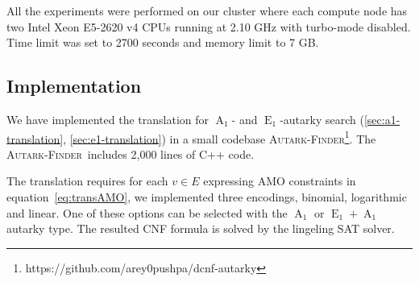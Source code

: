 \documentclass[runningheads]{llncs}
\DeclareMathOperator{\Aaut}{A}
\DeclareMathOperator{\Eaut}{E}
\newcommand{\autfinder}{\textsc{Autark-Finder}}
\begin{document}
All the experiments were performed on our cluster where each compute node has
two Intel Xeon E5-2620 v4 CPUs running at 2.10 GHz with turbo-mode disabled.
Time limit was set to 2700 seconds and memory limit to 7 GB.

\subsection{Implementation}
We have implemented the translation for $\Aaut_1$- and $\Eaut_1$-autarky search  (\ref{sec:a1-translation}, \ref{sec:e1-translation}) in a small codebase \autfinder\footnote{https://github.com/arey0pushpa/dcnf-autarky}. The \autfinder\ includes 2,000 lines of C++ code.

The translation requires for each $v \in E$ expressing AMO constraints in equation~\ref{eq:transAMO}, we implemented three encodings, binomial, logarithmic and linear. One of these options can be selected with the $\Aaut_1$ or $\Eaut_1+\Aaut_1$ autarky type. The resulted CNF formula is solved by the lingeling \cite{Biere-SAT-Competition-2017-solvers} SAT solver.
\end{document}
